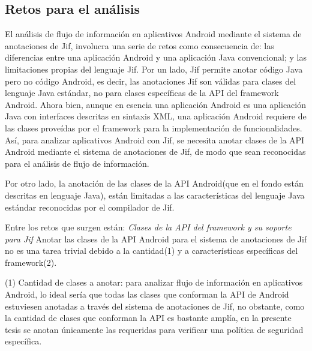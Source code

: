 \subsection{Retos para el análisis}
El análisis de flujo de información en aplicativos Android mediante el sistema
de anotaciones de Jif, involucra una serie de retos como consecuencia de: las
diferencias entre una aplicación Android y una aplicación Java convencional; y
las limitaciones propias del lenguaje Jif.\newline 
Por un lado, Jif permite anotar código Java pero no código Android, es decir,
las anotaciones Jif son válidas para clases del lenguaje Java estándar, no para
clases específicas de la API del framework Android.\newline 
Ahora bien, aunque en esencia una aplicación Android es una aplicación Java con
interfaces descritas en sintaxis XML, una aplicación Android requiere de las
clases proveídas por el framework para la implementación de
funcionalidades.\newline 
Así, para analizar aplicativos Android con Jif, se
necesita anotar clases de la API Android mediante el sistema de anotaciones de Jif, de modo que sean
reconocidas para el análisis de flujo de información. 

Por otro lado, la anotación de las clases de la API Android(que en el fondo
están descritas en lenguaje Java), están limitadas a las características del
lenguaje Java estándar reconocidas por el compilador de Jif.

Entre los retos que surgen están:\newline 
\emph{Clases de la API del framework y su soporte para Jif}\newline 
Anotar las clases de la API Android para el sistema de anotaciones de Jif no
es una tarea trivial debido a la cantidad(1) y a características específicas
del framework(2).

(1) Cantidad de clases a anotar: para analizar flujo de información en
aplicativos Android, lo ideal sería que todas las clases que conforman la API de
Android estuviesen anotadas a través del sistema de anotaciones de Jif, no
obstante, como la cantidad de clases que conforman la API es bastante amplía, en
la presente tesis se anotan únicamente las requeridas para verificar una
política de seguridad específica.
 
